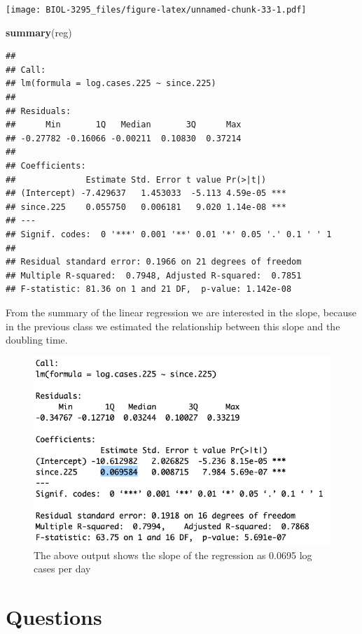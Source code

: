 \documentclass[]{book}
\newenvironment{Shaded}{\begin{snugshade}}{\end{snugshade}}
\newcommand{\KeywordTok}[1]{\textcolor[rgb]{0.13,0.29,0.53}{\textbf{{#1}}}}
\newcommand{\NormalTok}[1]{{#1}}
\begin{document}
\texttt{[image: BIOL-3295\_files/figure-latex/unnamed-chunk-33-1.pdf]}

\begin{Shaded}
\begin{Highlighting}[]
\KeywordTok{summary}\NormalTok{(reg)}
\end{Highlighting}
\end{Shaded}

\begin{verbatim}
## 
## Call:
## lm(formula = log.cases.225 ~ since.225)
## 
## Residuals:
##      Min       1Q   Median       3Q      Max 
## -0.27782 -0.16066 -0.00211  0.10830  0.37214 
## 
## Coefficients:
##              Estimate Std. Error t value Pr(>|t|)    
## (Intercept) -7.429637   1.453033  -5.113 4.59e-05 ***
## since.225    0.055750   0.006181   9.020 1.14e-08 ***
## ---
## Signif. codes:  0 '***' 0.001 '**' 0.01 '*' 0.05 '.' 0.1 ' ' 1
## 
## Residual standard error: 0.1966 on 21 degrees of freedom
## Multiple R-squared:  0.7948, Adjusted R-squared:  0.7851 
## F-statistic: 81.36 on 1 and 21 DF,  p-value: 1.142e-08
\end{verbatim}

From the summary of the linear regression we are interested in the
slope, because in the previous class we estimated the relationship
between this slope and the doubling time.

\begin{figure}
\includegraphics[width=0.95\linewidth]{figures/regression} \caption{The above output shows the slope of the regression as 0.0695 log cases per day}\label{fig:regression}
\end{figure}

\section{Questions}\label{questions-7}
\end{document}
